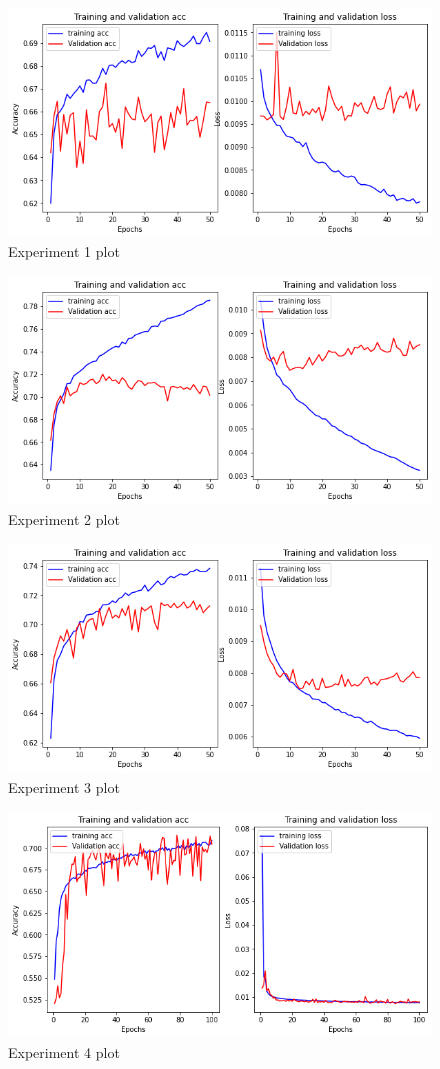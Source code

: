 \begin{figure}[H]
    \centering
    \includegraphics[width=0.7\columnwidth]{sections/figures/Experiment1.png}
    \caption{Experiment 1 plot}
    \label{fig:my_label}
\end{figure}

\begin{figure}[H]
    \centering
    \includegraphics[width=0.7\columnwidth]{sections/figures/Experiment2.png}
    \caption{Experiment 2 plot}
    \label{fig:my_label}
\end{figure}

\begin{figure}[H]
    \centering
    \includegraphics[width=0.7\columnwidth]{sections/figures/Experiment3.png}
    \caption{Experiment 3 plot}
    \label{fig:my_label}
\end{figure}

\begin{figure}[H]
    \centering
    \includegraphics[width=0.7\columnwidth]{sections/figures/Experiment4.png}
    \caption{Experiment 4 plot}
    \label{fig:my_label}
\end{figure}

